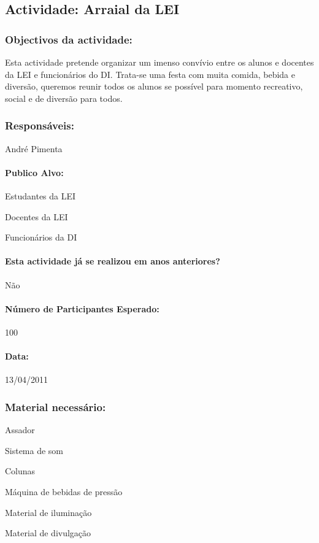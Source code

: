 \subsection{Actividade: Arraial da LEI}

\subsubsection*{Objectivos da actividade:}
Esta actividade pretende organizar um imenso convívio entre os alunos e docentes da LEI e funcionários do DI. Trata-se uma festa com muita comida, bebida e diversão, queremos reunir todos os alunos se possível para momento recreativo, social e de diversão para todos.
\subsubsection*{Responsáveis:}
\begin{itemizedash}
	\item{André Pimenta}
\end{itemizedash}

\paragraph{Publico Alvo: }
\begin{itemizedash}
     \item{Estudantes da LEI}
     \item{Docentes da LEI}
     \item{Funcionários da DI}
\end{itemizedash}

\paragraph{Esta actividade já se realizou em anos anteriores?}
Não

\paragraph{Número de Participantes Esperado:}
100

\paragraph{Data:} 13/04/2011

\subsubsection*{Material necessário:}
\begin{itemizedash}
	\item{Assador}
	\item{Sistema de som}
	\item{Colunas}
	\item{Máquina de bebidas de pressão}
	\item{Material de iluminação}
	\item{Material de divulgação}
\end{itemizedash}

